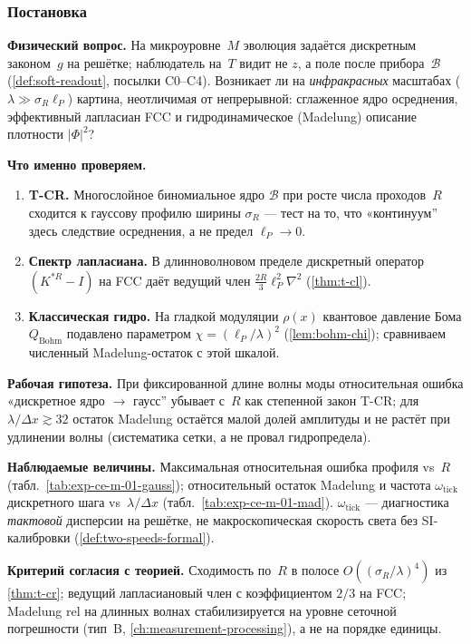 \label{exp:cem01}

\subsubsection*{Постановка}
\textbf{Физический вопрос.}
На микроуровне~$M$ эволюция задаётся дискретным законом~$g$ на решётке; наблюдатель на~$T$ видит не $z$, а поле после прибора~$\mathcal{B}$
(\cref{def:soft-readout}, посылки C0--C4).
Возникает ли на \emph{инфракрасных} масштабах ($\lambda\gg\sigma_R\ell_P$) картина, неотличимая от непрерывной:
сглаженное ядро осреднения, эффективный лапласиан FCC и гидродинамическое (Madelung) описание плотности $|\Phi|^2$?

\textbf{Что именно проверяем.}
\begin{enumerate}[label=\textbf{(\alph*)},leftmargin=*,itemsep=0.25em]
\item \textbf{T-CR.} Многослойное биномиальное ядро $\mathcal{B}$ при росте числа проходов~$R$
  сходится к гауссову профилю ширины $\sigma_R$ --- тест на то, что «континуум'' здесь следствие осреднения, а не предел $\ell_P\to 0$.
\item \textbf{Спектр лапласиана.} В длинноволновом пределе дискретный оператор $(K^{*R}-I)$ на FCC даёт ведущий член $\tfrac{2R}{3}\ell_P^2\nabla^2$
  (\cref{thm:t-cl}).
\item \textbf{Классическая гидро.} На гладкой модуляции $\rho(x)$ квантовое давление Бома $Q_{\mathrm{Bohm}}$ подавлено параметром $\chi=(\ell_P/\lambda)^2$
  (\cref{lem:bohm-chi}); сравниваем численный Madelung-остаток с этой шкалой.
\end{enumerate}

\textbf{Рабочая гипотеза.}
При фиксированной длине волны моды относительная ошибка «дискретное ядро $\to$ гаусс'' убывает с~$R$ как степенной закон T-CR;
для $\lambda/\Delta x\gtrsim 32$ остаток Madelung остаётся малой долей амплитуды и не растёт при удлинении волны
(систематика сетки, а не провал гидропредела).

\textbf{Наблюдаемые величины.}
Максимальная относительная ошибка профиля vs~$R$ (табл.~\ref{tab:exp-ce-m-01-gauss});
относительный остаток Madelung и частота $\omega_{\mathrm{tick}}$ дискретного шага vs~$\lambda/\Delta x$ (табл.~\ref{tab:exp-ce-m-01-mad}).
$\omega_{\mathrm{tick}}$ --- диагностика \emph{тактовой} дисперсии на решётке, не макроскопическая скорость света без SI-калибровки (\cref{def:two-speeds-formal}).

\textbf{Критерий согласия с теорией.}
Сходимость по~$R$ в полосе $O((\sigma_R/\lambda)^4)$ из \cref{thm:t-cr};
ведущий лапласиановый член с коэффициентом $2/3$ на FCC;
Madelung rel на длинных волнах стабилизируется на уровне сеточной погрешности (тип~B, \cref{ch:measurement-processing}), а не на порядке единицы.


